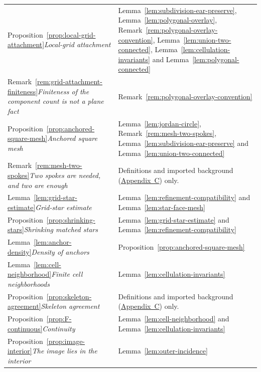 \documentclass[11pt]{article}
\theoremstyle{mainplain}
\theoremstyle{mainroman}
\theoremstyle{definition}
\numberwithin{equation}{section}
\begin{document}
\begin{longtable}{@{}>{\raggedright\arraybackslash}p{}>{\raggedright\arraybackslash}p{}@{}}
Proposition~\ref{prop:local-grid-attachment}\newline\emph{Local-grid attachment} & Lemma~\ref{lem:subdivision-ear-preserve}, Lemma~\ref{lem:polygonal-overlay}, Remark~\ref{rem:polygonal-overlay-convention}, Lemma~\ref{lem:union-two-connected}, Lemma~\ref{lem:cellulation-invariants} and Lemma~\ref{lem:polygonal-connected} \\
Remark~\ref{rem:grid-attachment-finiteness}\newline\emph{Finiteness of the component count is not a plane fact} & Remark~\ref{rem:polygonal-overlay-convention} \\
Proposition~\ref{prop:anchored-square-mesh}\newline\emph{Anchored square mesh} & Lemma~\ref{lem:jordan-circle}, Remark~\ref{rem:mesh-two-spokes}, Lemma~\ref{lem:subdivision-ear-preserve} and Lemma~\ref{lem:union-two-connected} \\
Remark~\ref{rem:mesh-two-spokes}\newline\emph{Two spokes are needed, and two are enough} & Definitions and imported background (\hyperref[app:background]{Appendix~C}) only. \\
Lemma~\ref{lem:grid-star-estimate}\newline\emph{Grid-star estimate} & Lemma~\ref{lem:refinement-compatibility} and Lemma~\ref{lem:star-face-mesh} \\
Proposition~\ref{prop:shrinking-stars}\newline\emph{Shrinking matched stars} & Lemma~\ref{lem:grid-star-estimate} and Lemma~\ref{lem:refinement-compatibility} \\
Lemma~\ref{lem:anchor-density}\newline\emph{Density of anchors} & Proposition~\ref{prop:anchored-square-mesh} \\
Lemma~\ref{lem:cell-neighborhood}\newline\emph{Finite cell neighborhoods} & Lemma~\ref{lem:cellulation-invariants} \\
Proposition~\ref{prop:skeleton-agreement}\newline\emph{Skeleton agreement} & Definitions and imported background (\hyperref[app:background]{Appendix~C}) only. \\
Proposition~\ref{prop:F-continuous}\newline\emph{Continuity} & Lemma~\ref{lem:cell-neighborhood} and Lemma~\ref{lem:cellulation-invariants} \\
Proposition~\ref{prop:image-interior}\newline\emph{The image lies in the interior} & Lemma~\ref{lem:outer-incidence} \\

\end{longtable}
\end{document}
